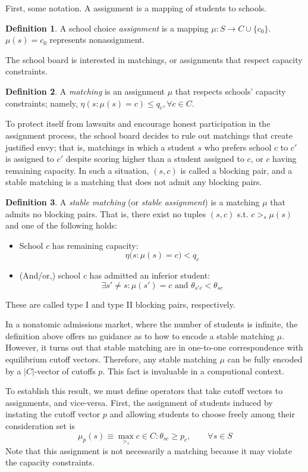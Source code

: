 \documentclass[12pt]{article}
\theoremstyle{definition}
\newtheorem{definition}{Definition}
\begin{document}
First, some notation. A assignment is a mapping of students to schools.
\begin{definition}
A school choice \emph{assignment} is a mapping $\mu: S \to C \cup \{c_0\}$. $\mu(s) = c_0$ represents nonassignment.
\end{definition}
The school board is interested in matchings, or assignments that respect capacity constraints. 
\begin{definition}
A \emph{matching} is an assignment $\mu$ that respects schools' capacity constraints; namely, $\eta (s: \mu(s) = c) \leq q_c, \forall c \in C$. 
\end{definition}
To protect itself from lawsuits and encourage honest participation in the assignment process, the school board decides to rule out matchings that create justified envy; that is, matchings in which a student $s$ who prefers school $c$ to $c'$ is assigned to $c'$ despite scoring higher than a student assigned to $c$, or $c$ having remaining capacity. In such a situation, $(s, c)$ is called a blocking pair, and a stable matching is a matching that does not admit any blocking pairs.
\begin{definition}
A \emph{stable matching} (or \emph{stable assignment}) is a matching $\mu$ that admits no blocking pairs. That is, there exist no tuples $(s, c)$ s.t. $c >_s \mu(s)$ and one of the following holds:
\begin{itemize}
\item School $c$ has remaining capacity:
\[\eta\bigl(s: \mu(s) = c \bigr) < q_c\]
\item (And/or,) school $c$ has admitted an inferior student:
\[\exists s' \neq s: \mu(s') = c \text{ and } \theta_{s'c} < \theta_{sc}\] 
\end{itemize}
These are called type I and type II blocking pairs, respectively.
\end{definition}

In a nonatomic admissions market, where the number of students is infinite, the definition above offers no guidance as to how to encode a stable matching $\mu$. However, it turns out that stable matching are in one-to-one correspondence with equilibrium cutoff vectors. Therefore, any stable matching $\mu$ can be fully encoded by a $|C|$-vector of cutoffs $p$. This fact is invaluable in a computional context.

To establish this result, we must define operators that take cutoff vectors to assignments, and vice-versa. First, the assignment of students induced by instating the cutoff vector $p$ and allowing students to choose freely among their consideration set is
\[\mu_p(s) \equiv \max_{>_s} c \in C : \theta_{sc} \geq p_c, \qquad \forall s \in S\] 
Note that this assignment is not necessarily a matching because it may violate the capacity constraints. 
\end{document}
